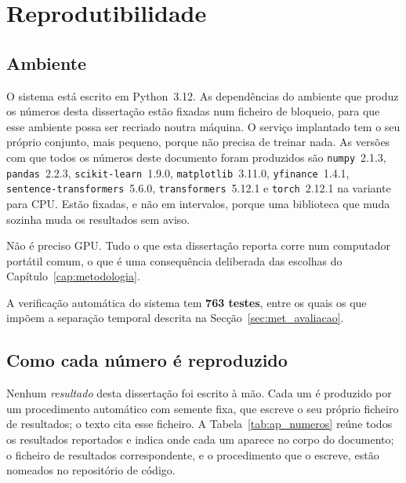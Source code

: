 
\chapter{Reprodutibilidade}
\label{ap:reprodutibilidade}

\section{Ambiente}
\label{sec:ap_ambiente}

O sistema está escrito em Python~3.12. As dependências do ambiente que produz os números desta
dissertação estão fixadas num ficheiro de bloqueio, para que esse ambiente possa ser recriado noutra
máquina. O serviço implantado tem o seu próprio conjunto, mais pequeno, porque não precisa de treinar
nada. As versões com que todos os números deste documento foram produzidos são
\texttt{numpy}~2.1.3, \texttt{pandas}~2.2.3, \texttt{scikit-learn}~1.9.0,
\texttt{matplotlib}~3.11.0, \texttt{yfinance}~1.4.1, \texttt{sentence-transformers}~5.6.0,
\texttt{transformers}~5.12.1 e \texttt{torch}~2.12.1 na variante para CPU. Estão fixadas, e não em
intervalos, porque uma biblioteca que muda sozinha muda os resultados sem aviso.


Não é preciso GPU. Tudo o que esta dissertação reporta corre num computador portátil comum, o que é
uma consequência deliberada das escolhas do Capítulo~\ref{cap:metodologia}.

A verificação automática do sistema tem \textbf{763 testes}, entre os quais os que impõem a
separação temporal descrita na Secção~\ref{sec:met_avaliacao}.

\section{Como cada número é reproduzido}
\label{sec:ap_numeros}

Nenhum \emph{resultado} desta dissertação foi escrito à mão. Cada um é produzido por um
procedimento automático com semente fixa, que escreve o seu próprio ficheiro de resultados; o texto
cita esse ficheiro. A Tabela~\ref{tab:ap_numeros} reúne todos os resultados reportados e indica onde
cada um aparece no corpo do documento; o ficheiro de resultados correspondente, e o procedimento que
o escreve, estão nomeados no repositório de código.

